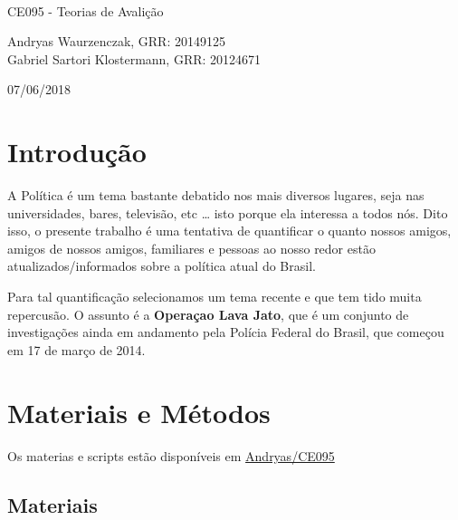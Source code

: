 \documentclass[]{article}
\title{}
\author{}
\date{}
\begin{document}
\begin{titlepage}
\\

\vspace{7.5cm}


\vspace{3cm}

CE095 - Teorias de Avalição

\vspace{2cm}

Andryas Waurzenczak, GRR: 20149125 \\
Gabriel Sartori Klostermann, GRR: 20124671


\vfill

07/06/2018
\end{titlepage}


\pagebreak
\tableofcontents
\pagebreak

\section{Introdução}\label{introducao}

A Política é um tema bastante debatido nos mais diversos lugares, seja
nas universidades, bares, televisão, etc \ldots{} isto porque ela
interessa a todos nós. Dito isso, o presente trabalho é uma tentativa de
quantificar o quanto nossos amigos, amigos de nossos amigos, familiares
e pessoas ao nosso redor estão atualizados/informados sobre a política
atual do Brasil.

Para tal quantificação selecionamos um tema recente e que tem tido muita
repercusão. O assunto é a \textbf{Operaçao Lava Jato}, que é um conjunto
de investigações ainda em andamento pela Polícia Federal do Brasil, que
começou em 17 de março de 2014.

\section{Materiais e Métodos}\label{materiais-e-metodos}

Os materias e scripts estão disponíveis em
\href{https://github.com/Andryas/ce095}{Andryas/CE095}

\subsection{Materiais}\label{materiais}
\end{document}
